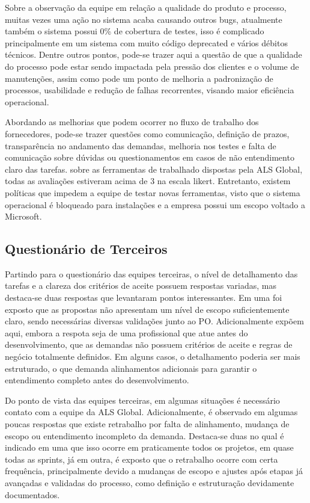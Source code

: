\documentclass[12pt,a4paper]{report}
\begin{document}
Sobre a observação da equipe em relação a qualidade do produto e processo, muitas vezes uma ação no sistema acaba causando outros bugs, atualmente também o sistema possui 0\% de cobertura de testes, isso é complicado principalmente em um sistema com muito código deprecated e vários débitos técnicos. Dentre outros pontos, pode-se trazer aqui a questão de que a qualidade do processo pode estar sendo impactada pela pressão dos clientes e o volume de manutenções, assim como pode um ponto de melhoria a padronização de processos, usabilidade e redução de falhas recorrentes, visando maior eficiência operacional.

Abordando as melhorias que podem ocorrer no fluxo de trabalho dos fornecedores, pode-se trazer questões como comunicação, definição de prazos, transparência no andamento das demandas, melhoria nos testes e falta de comunicação sobre dúvidas ou questionamentos em casos de não entendimento claro das tarefas. sobre as ferramentas de trabalhado dispostas pela ALS Global, todas as avaliações estiveram acima de 3 na escala likert. Entretanto, existem políticas que impedem a equipe de testar novas ferramentas, visto que o sistema operacional é bloqueado para instalações e a empresa possui um escopo voltado a Microsoft. 

\subsection{Questionário de Terceiros}

Partindo para o questionário das equipes terceiras, o nível de detalhamento das tarefas e a clareza dos critérios de aceite possuem respostas variadas, mas destaca-se duas respostas que levantaram pontos interessantes. Em uma foi exposto que as propostas não apresentam um nível de escopo suficientemente claro, sendo necessárias diversas validações junto ao PO. Adicionalmente expõem aqui, embora a respota seja de uma profissional que atue antes do desenvolvimento, que as demandas não possuem critérios de aceite e regras de negócio totalmente definidos. Em alguns casos, o detalhamento poderia ser mais estruturado, o que demanda alinhamentos adicionais para garantir o entendimento completo antes do desenvolvimento.

Do ponto de vista das equipes terceiras, em algumas situações é necessário contato com a equipe da ALS Global. Adicionalmente, é observado em algumas poucas respostas que existe retrabalho por falta de alinhamento, mudança de escopo ou entendimento incompleto da demanda. Destaca-se duas no qual é indicado em uma que isso ocorre em praticamente todos os projetos, em quase todas as sprints, já em outra, é exposto que o retrabalho ocorre com certa frequência, principalmente devido a mudanças de escopo e ajustes após etapas já avançadas e validadas do processo, como definição e estruturação devidamente documentados. 
\end{document}
